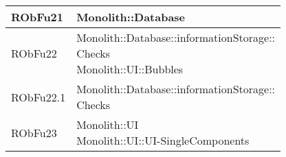 \begin{center}
\begin{longtable}{|
*{1}{>{\centering\arraybackslash}m{2.5cm}|}
*{1}{>{\centering\arraybackslash}m{7.5cm}|}}
RObFu21 & \makecell[l]{Monolith::Database
\\}\\\hline
RObFu22 & \makecell[l]{Monolith::Database::informationStorage:: \\ \hfill Checks
\\Monolith::UI::Bubbles
\\}\\\hline
RObFu22.1 & \makecell[l]{Monolith::Database::informationStorage:: \\ \hfill Checks
\\}\\\hline
RObFu23 & \makecell[l]{Monolith::UI
\\Monolith::UI::UI-SingleComponents
\\}\\\hline
\end{longtable}
\end{center}

